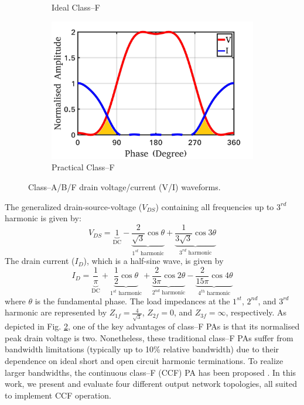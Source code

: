 \documentclass[conference]{IEEEtran}
\begin{document}
\begin{figure}[!t]
\begin{subfigure}{0.24\textwidth}
\caption{Ideal Class--F}
\label{fig:ICF_wave_VI}
\end{subfigure}
\begin{subfigure}{0.24\textwidth}
\includegraphics[width=1\textwidth]{Images/Intro/CF_wave_VI_shaded.pdf}
\caption{Practical Class--F}
\label{fig:CF_wave_VI}
\end{subfigure}
\caption{Class--A/B/F drain  voltage/current (V/I) waveforms.}
\label{fig:wave_VI}
\vspace{-0.25in}
\end{figure}
The generalized drain-source-voltage ($V_{DS}$) containing all frequencies up to $3^{rd}$ harmonic \cite{Gen_Vds_eqn} is given by:
\begin{equation}
V_{DS}=\underbrace{1}_{\text{DC}}-\underbrace{\frac{2}{\sqrt{3}} \cos \theta}_{\text{$1^{st}$ harmonic}}+\underbrace{\frac{1}{3 \sqrt{3}} \cos 3 \theta}_{\text{$3^{rd}$ harmonic}}
\label{eqn_CF_V}
\end{equation}
The drain current ($I_{D}$), which is a half-sine wave, is given by
\begin{equation}
I_{D}=\underbrace{\frac{1}{\pi}}_{\text{DC}}+\underbrace{\frac{1}{2} \cos \theta}_{\text{$1^{st}$ harmonic}}+\underbrace{\frac{2}{3 \pi} \cos 2 \theta}_{\text{$2^{nd}$ harmonic}}-\underbrace{\frac{2}{15 \pi} \cos 4 \theta}_{\text{$4^{th}$ harmonic}}
\label{eqn_CCF_I}
\end{equation}
where $\theta$ is the fundamental phase. The load impedances at the  $1^{st}$, $2^{nd}$, and $3^{rd}$ harmonic are represented by $Z_{1f}=\frac{4}{\sqrt{3}}$, $Z_{2f}=0$, and $Z_{3f}=\infty$, respectively. As depicted in Fig. \ref{fig:CF_wave_VI},  one of the key advantages of class--F PAs is that its normalised peak drain voltage is two. Nonetheless, these traditional class--F PAs suffer from bandwidth limitations (typically up to 10\% relative bandwidth) due to their dependence on ideal short and open circuit harmonic terminations. To realize larger bandwidths, the continuous class--F (CCF) PA has been proposed \cite{CCF_reason}. In this work, we present and evaluate four different output network topologies, all suited to implement CCF operation. 
\end{document}
